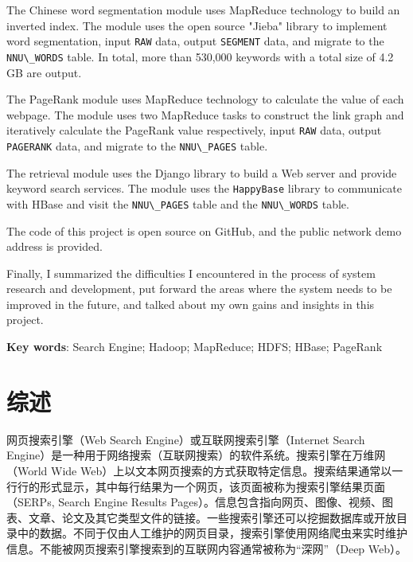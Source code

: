 \documentclass{ctexart}
\newcommand{\code}[1]{\colorbox{backcolor}{\lstinline|#1|}}
\begin{document}
    The Chinese word segmentation module uses MapReduce technology to build an inverted index. The module uses the open source "Jieba" library to implement word segmentation, input \code{RAW} data, output \code{SEGMENT} data, and migrate to the \code{NNU\_WORDS} table. In total, more than 530,000 keywords with a total size of 4.2 GB are output.

    The PageRank module uses MapReduce technology to calculate the value of each webpage. The module uses two MapReduce tasks to construct the link graph and iteratively calculate the PageRank value respectively, input \code{RAW} data, output \code{PAGERANK} data, and migrate to the \code{NNU\_PAGES} table.

    The retrieval module uses the Django library to build a Web server and provide keyword search services. The module uses the \code{HappyBase} library to communicate with HBase and visit the \code{NNU\_PAGES} table and the \code{NNU\_WORDS} table.

    The code of this project is open source on GitHub, and the public network demo address is provided.

    Finally, I summarized the difficulties I encountered in the process of system research and development, put forward the areas where the system needs to be improved in the future, and talked about my own gains and insights in this project.

    \textbf{Key words}: Search Engine; Hadoop; MapReduce; HDFS; HBase; PageRank

    \newpage

    \thispagestyle{table-of-contents}
    \tableofcontents

    \newpage

    \setcounter{page}{1}


    \section{综述}\label{sec:introduction}

    网页搜索引擎（Web Search Engine）或互联网搜索引擎（Internet Search Engine）是一种用于网络搜索（互联网搜索）的软件系统。搜索引擎在万维网（World Wide Web）上以文本网页搜索的方式获取特定信息。搜索结果通常以一行行的形式显示，其中每行结果为一个网页，该页面被称为搜索引擎结果页面（SERPs, Search Engine Results Pages）。信息包含指向网页、图像、视频、图表、文章、论文及其它类型文件的链接。一些搜索引擎还可以挖掘数据库或开放目录中的数据。不同于仅由人工维护的网页目录，搜索引擎使用网络爬虫来实时维护信息。不能被网页搜索引擎搜索到的互联网内容通常被称为“深网”（Deep Web）\cite{wikipedia-search-engine}。
\end{document}

